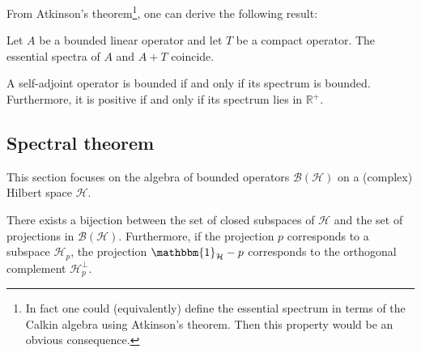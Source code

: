 
    From Atkinson's theorem\footnote{In fact one could (equivalently) define the essential spectrum in terms of the Calkin algebra using Atkinson's theorem. Then this property would be an obvious consequence.}, one can derive the following result:
    \begin{property}
        Let $A$ be a bounded linear operator and let $T$ be a compact operator. The essential spectra of $A$ and $A+T$ coincide.
    \end{property}

    \begin{property}
        A self-adjoint operator is bounded if and only if its spectrum is bounded. Furthermore, it is positive if and only if its spectrum lies in $\mathbb{R}^+$.
    \end{property}

\subsection{Spectral theorem}\label{section:PVM}

    This section focuses on the algebra of bounded operators $\mathcal{B}(\mathcal{H})$ on a (complex) Hilbert space $\mathcal{H}$.

    \begin{property}
        There exists a bijection between the set of closed subspaces of $\mathcal{H}$ and the set of projections in $\mathcal{B}(\mathcal{H})$. Furthermore, if the projection $p$ corresponds to a subspace $\mathcal{H}_p$, the projection $\mathbbm{1}_{\mathcal{H}}-p$ corresponds to the orthogonal complement $\mathcal{H}_p^\perp$.
    \end{property}

